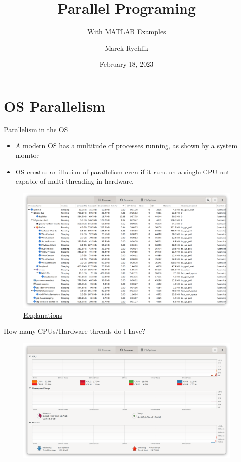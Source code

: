 \documentclass[pdflatex,colorlinks,landscape]{beamer}
\date{February 18, 2023}
\title[Parallelism]{Parallel Programing}
\subtitle{With MATLAB Examples}
\author{Marek Rychlik}
\institute[University of Arizona]{
  Department of Mathematics\\
  University of Arizona
}
\renewcommand\emph[1]{{\color{magenta}#1}}
\begin{document}

\begin{frame}
  \titlepage
\end{frame}

\section{OS Parallelism}

\begin{frame}{Parallelism in the OS}
  \begin{itemize}
  \item A modern OS has a multitude of processes running, as shown by a \emph{system
      monitor}
  \item OS creates {\color{red}an illusion of parallelism} even if it runs on a single CPU
    not capable of multi-threading in hardware.
  \end{itemize}
  \begin{figure}
    \includegraphics[width=.9\textwidth]{SystemMonitor.png}
    \caption{\href{https://askubuntu.com/questions/19442/what-is-the-waiting-channel-of-a-process}{Explanations}}
  \end{figure}
\end{frame}

\begin{frame}{How many CPUs/Hardware threads do I have?}
  \begin{figure}
    \includegraphics[width=\textwidth]{Resources.png}
  \end{figure}
\end{frame}
\end{document}
